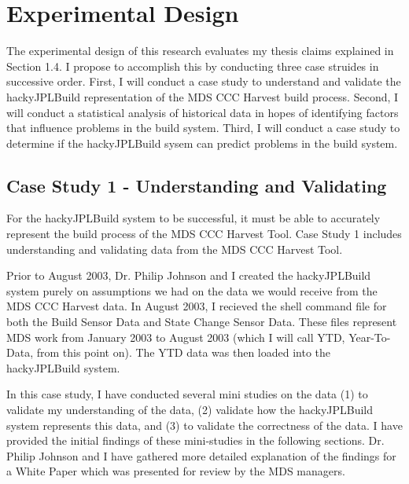 
\chapter{Experimental Design}

The experimental design of this research evaluates my thesis claims
explained in Section 1.4.  I propose to accomplish this by conducting three 
case struides in successive order. First, I will conduct a case study to
understand and validate the hackyJPLBuild representation of the MDS CCC
Harvest build process.  Second, I will conduct a statistical analysis of
historical data in hopes of identifying factors that influence problems in
the build system.  Third, I will conduct a case study to determine if the
hackyJPLBuild sysem can predict problems in the build system.

\section{Case Study 1 - Understanding and Validating}
For the hackyJPLBuild system to be successful, it must be able to
accurately represent the build process of the MDS CCC Harvest Tool.  Case
Study 1 includes understanding and validating data from the MDS CCC Harvest 
Tool.

Prior to August 2003, Dr. Philip Johnson and I created the hackyJPLBuild
system purely on assumptions we had on the data we would receive from the
MDS CCC Harvest data.  In August 2003, I recieved the shell command file
for both the Build Sensor Data and State Change Sensor Data.  These files
represent MDS work from January 2003 to August 2003 (which I will call YTD, 
Year-To-Data, from this point on).  The YTD data was then loaded into the
hackyJPLBuild system.

In this case study, I have conducted several mini studies on the data (1)
to validate my understanding of the data, (2) validate how the
hackyJPLBuild system represents this data, and (3) to validate the
correctness of the data.  I have provided the initial findings of these
mini-studies in the following sections.  Dr. Philip Johnson and I have
gathered more detailed explanation of the findings for a White Paper which
was presented for review by the MDS managers.


